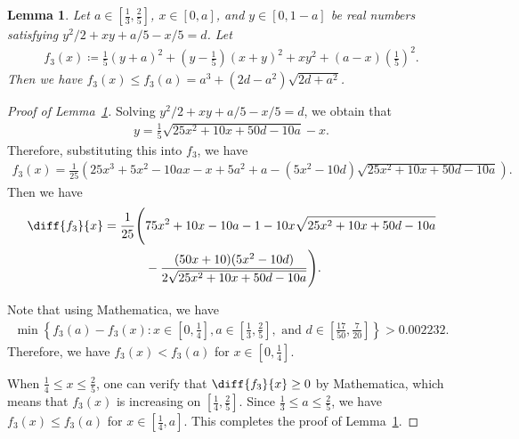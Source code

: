 \documentclass[11pt,a4paper]{article}
\newtheorem{lemma}[definition]{Lemma}
\begin{document}
\begin{appendix}

\begin{lemma}\label{Lem:calculation_3}
Let $a \in \left[\tfrac{1}{3},\tfrac{2}{5}\right]$, $x \in \left[0,a\right]$, and $y \in \left[0,1-a\right]$ be real numbers satisfying $y^2/2 + xy + a/5-x/5 = d$. 
Let
\begin{align*}
f_3(x) 
\coloneqq \frac{1}{5}(y+a)^2 + \left(y-\frac{1}{5}\right)(x+y)^2 + x y^2+ \left(a-x\right)\left(\frac{1}{5}\right)^2.
\end{align*}
Then we have $f_3(x) \le f_3(a) = a^3 + (2d - a^2)\sqrt{2d+a^2}$. 
\end{lemma}

\begin{proof}[Proof of Lemma~\ref{Lem:calculation_3}]
Solving $y^2/2 + xy + a/5-x/5 = d$, we obtain that 
\begin{align*}
y = \frac{1}{5} \sqrt{25x^2+10x+50d-10a}-x. 
\end{align*}
Therefore, substituting this into $f_3$, we have 
\begin{align*}
f_3(x) 
=\frac{1}{25}\left(25x^3+5x^2-10ax-x+5a^2+a-\left(5x^2-10d\right)\sqrt{25x^2+10x+50d-10a}\right). 
\end{align*}
Then we have 
\begin{align*}
\diff{f_3}{x} 
= \frac{1}{25}\Bigg(&75x^2+10x-10a-1-10x \sqrt{25x^2+10x+50d-10a}\\
&-\frac{(50x+10)(5x^2 -10d)}{2\sqrt{25x^2+10x+50d-10a}}\Bigg). 
\end{align*}

Note that using Mathematica, we have
\begin{align*}
\min \left\{f_3(a)-f_3(x) \colon x \in \left[0,\frac{1}{4}\right], a \in \left[\frac{1}{3},\frac{2}{5}\right], \text{~and~} d \in \left[\frac{17}{50},\frac{7}{20}\right] \right\}
> 0.002232. 
\end{align*}
Therefore, we have $f_3(x) < f_3(a)$ for $x \in \left[0,\tfrac{1}{4}\right]$. 

When $\tfrac{1}{4} \le x \le \tfrac{2}{5}$, one can verify that $\diff{f_3}{x} \ge 0$ by Mathematica, which means that $f_3(x)$ is increasing on $\left[\tfrac{1}{4},\tfrac{2}{5}\right]$. 
Since $\tfrac{1}{3} \le a \le \tfrac{2}{5}$, we have $f_3(x) \le f_3(a)$ for $x \in \left[\tfrac{1}{4},a\right]$. 
This completes the proof of Lemma~\ref{Lem:calculation_3}.  
\end{proof}



\end{appendix}
\end{document}
